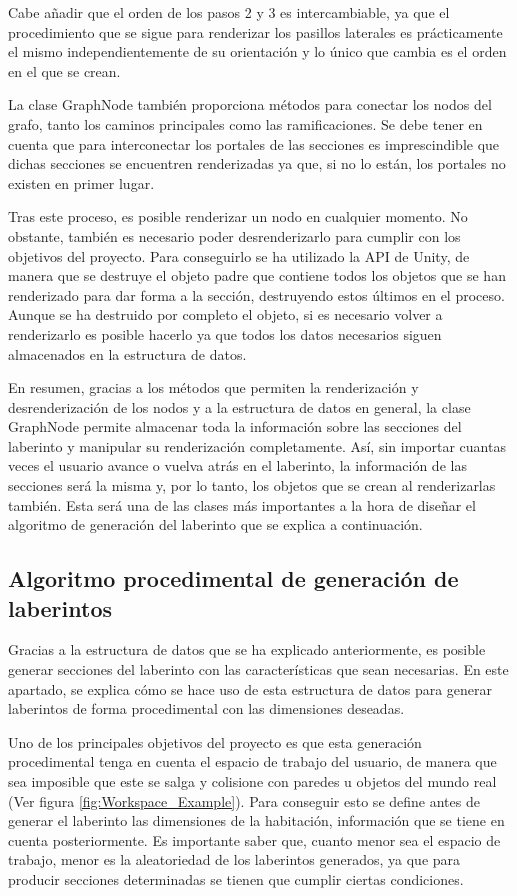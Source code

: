 \documentclass[../main.tex]{subfiles}
\begin{document}
Cabe añadir que el orden de los pasos 2 y 3 es intercambiable, ya que el procedimiento que se sigue para renderizar los pasillos laterales es prácticamente el mismo independientemente de su orientación y lo único que cambia es el orden en el que se crean.

La clase GraphNode también proporciona métodos para conectar los nodos del grafo, tanto los caminos principales como las ramificaciones. Se debe tener en cuenta que para interconectar los portales de las secciones es imprescindible que dichas secciones se encuentren renderizadas ya que, si no lo están, los portales no existen en primer lugar. 

Tras este proceso, es posible renderizar un nodo en cualquier momento. No obstante, también es necesario poder desrenderizarlo para cumplir con los objetivos del proyecto. Para conseguirlo se ha utilizado la API de Unity, de manera que se destruye el objeto padre que contiene todos los objetos que se han renderizado para dar forma a la sección, destruyendo estos últimos en el proceso. Aunque se ha destruido por completo el objeto, si es necesario volver a renderizarlo es posible hacerlo ya que todos los datos necesarios siguen almacenados en la estructura de datos.

En resumen, gracias a los métodos que permiten la renderización y desrenderización de los nodos y a la estructura de datos en general, la clase GraphNode permite almacenar toda la información sobre las secciones del laberinto y manipular su renderización completamente. Así, sin importar cuantas veces el usuario avance o vuelva atrás en el laberinto, la información de las secciones será la misma y, por lo tanto, los objetos que se crean al renderizarlas también. Esta será una de las clases más importantes a la hora de diseñar el algoritmo de generación del laberinto que se explica a continuación.

\subsection{Algoritmo procedimental de generación de laberintos}

Gracias a la estructura de datos que se ha explicado anteriormente, es posible generar secciones del laberinto con las características que sean necesarias. En este apartado, se explica cómo se hace uso de esta estructura de datos para generar laberintos de forma procedimental con las dimensiones deseadas.

Uno de los principales objetivos del proyecto es que esta generación procedimental tenga en cuenta el espacio de trabajo del usuario, de manera que sea imposible que este se salga y colisione con paredes u objetos del mundo real (Ver figura \ref{fig:Workspace_Example}). Para conseguir esto se define antes de generar el laberinto las dimensiones de la habitación, información que se tiene en cuenta posteriormente. Es importante saber que, cuanto menor sea el espacio de trabajo, menor es la aleatoriedad de los laberintos generados, ya que para producir secciones determinadas se tienen que cumplir ciertas condiciones.
\end{document}

